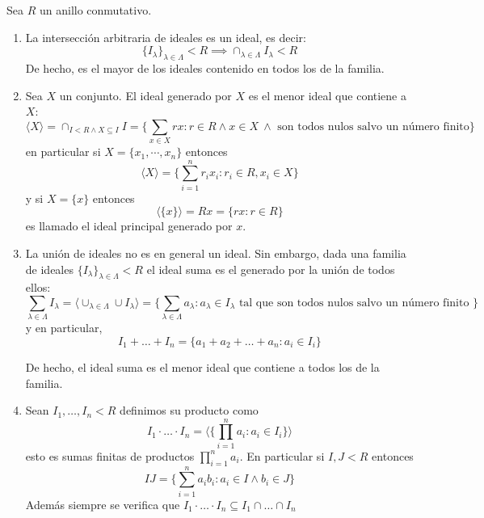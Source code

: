 \begin{proposition}
	Sea $R$ un anillo conmutativo.
	
	\begin{enumerate}
		\item La intersección arbitraria de ideales es un ideal, es decir: $$\{I_\lambda\}_{\lambda \in \Lambda} < R \implies \cap_{\lambda \in \Lambda} I_{\lambda} < R$$ De hecho, es el mayor de los ideales contenido en todos los de la familia. 
		\item Sea $X$ un conjunto. El ideal generado por $X$ es el menor ideal que contiene a $X$: $$\langle X \rangle = \cap_{I < R \land X \subseteq I} I = \{\sum_{x \in X} rx:r \in R \land x \in X\ \land \text{ son todos nulos salvo un número finito}\}$$ en particular si $X = \{x_1,\cdots,x_n\}$ entonces $$\langle X \rangle = \{\sum_{i = 1}^n r_ix_i:r_i \in R,x_i \in X\}$$ y si $X = \{x\}$ entonces $$\langle \{x\} \rangle = Rx =  \{rx:r \in R\}$$ es llamado el ideal principal generado por $x$. 
		\item La unión de ideales no es en general un ideal. Sin embargo, dada una familia de ideales $\{I_\lambda\}_{\lambda \in \Lambda} < R$ el ideal suma es el generado por la unión de todos ellos: $$\sum_{\lambda \in \Lambda} I_{\lambda} = \langle \cup_{\lambda \in \Lambda} \cup I_{\lambda} \rangle = \{\sum_{\lambda \in \Lambda} a_{\lambda}: a_{\lambda} \in I_{\lambda} \text{ tal que son todos nulos salvo un número finito }\}$$ y en particular, $$I_1 + \ldots + I_n = \{a_1+a_2+\ldots+a_n:a_i \in I_i\}$$
		
		De hecho, el ideal suma es el menor ideal que contiene a todos los de la familia. 
		\item Sean $I_1,\ldots,I_n < R$ definimos su producto como  $$I_1 \cdot \ldots \cdot I_n = \langle \{\prod_{i = 1}^n a_i:a_i \in I_i\} \rangle$$ esto es sumas finitas de productos $\prod_{i = 1}^n a_i$. En particular si $I,J < R$ entonces $$IJ = \{\sum_{i = 1}^n a_ib_i:a_i \in I \land b_i \in J\}$$ Además siempre se verifica que $I_1 \cdot \ldots \cdot I_n \subseteq I_1 \cap \ldots \cap I_n$
	\end{enumerate}
\end{proposition}
